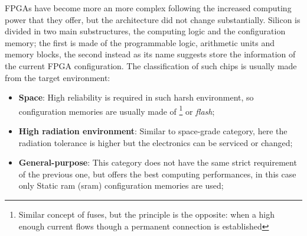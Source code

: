 \documentclass[../../main.tex]{subfiles}
\begin{document}
FPGAs have become more an more complex following the increased computing power that they offer, but the architecture did not change substantially. Silicon is divided in two main substructures, the computing logic and the configuration memory; the first is made of the programmable logic, arithmetic units and memory blocks, the second instead as its name suggests store the information of the current FPGA configuration. The classification of such chips is usually made from the target environment:
\begin{itemize}
    \item \textbf{Space}: High reliability is required in such harsh environment, so configuration memories are usually made of \footnote{Similar concept of fuses, but the principle is the opposite: when a high enough current flows though a permanent connection is established} or \textit{flash};
    \item \textbf{High radiation environment}: Similar to space-grade category, here the radiation tolerance is higher but the electronics can be serviced or changed;
    \item \textbf{General-purpose}: This category does not have the same strict requirement of the previous one, but offers the best computing performances, in this case only Static \acrshort{ram} (\acrshort{sram}) configuration memories are used;
\end{itemize}
        
\end{document}
